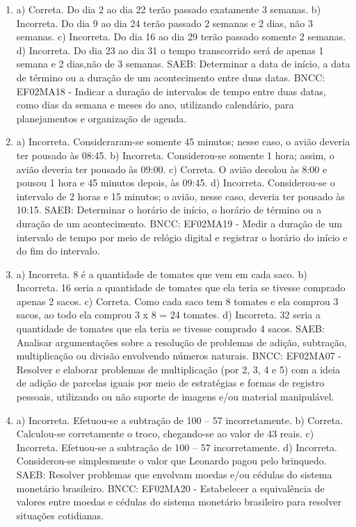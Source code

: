 \begin{enumerate}
\item
a) Correta. Do dia 2 ao dia 22 terão passado exatamente 3 semanas.
b) Incorreta. Do dia 9 ao dia 24 terão passado 2 semanas e 2 dias, não 3 semanas.
c) Incorreta. Do dia 16 ao dia 29 terão passado somente 2 semanas.
d) Incorreta. Do dia 23 ao dia 31 o tempo transcorrido será de apenas 1 semana e 2 dias,não de 3 semanas.
SAEB: Determinar a data de início, a data de término ou a
duração de um acontecimento entre duas datas.
BNCC: EF02MA18 - Indicar a duração de intervalos de tempo entre
duas datas, como dias da semana e meses do ano, utilizando calendário,
para planejamentos e organização de agenda.

\item
a) Incorreta. Consideraram-se somente 45 minutos; nesse caso, o avião deveria ter pousado às 08:45.
b) Incorreta. Considerou-se somente 1 hora; assim, o avião deveria ter pousado às 09:00.
c) Correta. O avião decolou às 8:00 e pousou 1 hora e 45 minutos depois, às 09:45.
d) Incorreta. Considerou-se o intervalo de 2 horas e 15 minutos; o avião, nesse caso, deveria ter
pousado às 10:15.
SAEB: Determinar o horário de início, o horário de término ou a
duração de um acontecimento.
BNCC: EF02MA19 - Medir a duração de um intervalo de tempo por meio de
relógio digital e registrar o horário do início e do fim do intervalo.

\item
a) Incorreta. 8 é a quantidade de tomates que vem em cada saco.
b) Incorreta. 16 seria a quantidade de tomates que ela teria se tivesse comprado apenas 2 sacos.
c) Correta. Como cada saco tem 8 tomates e ela comprou 3 sacos, ao todo ela comprou 3 x 8 = 24 tomates.
d) Incorreta. 32 seria a quantidade de tomates que ela teria se tivesse comprado 4 sacos.
SAEB: Analisar argumentações sobre a resolução de problemas de
adição, subtração, multiplicação ou divisão envolvendo números naturais.
BNCC: EF02MA07 - Resolver e elaborar problemas de multiplicação (por 2,
3, 4 e 5) com a ideia de adição de parcelas iguais por meio de
estratégias e formas de registro pessoais, utilizando ou não suporte de
imagens e/ou material manipulável.

\item
a) Incorreta. Efetuou-se a subtração de 100 -- 57 incorretamente.
b) Correta. Calculou-se corretamente o troco, chegando-se ao valor de 43 reais.
c) Incorreta. Efetuou-se a subtração de 100 -- 57 incorretamente.
d) Incorreta. Considerou-se simplesmente o valor que Leonardo pagou pelo brinquedo.
SAEB: Resolver problemas que envolvam moedas e/ou cédulas do
sistema monetário brasileiro. 
BNCC: EF02MA20 - Estabelecer a
equivalência de valores entre moedas e cédulas do sistema monetário
brasileiro para resolver situações cotidianas.


\end{enumerate}
